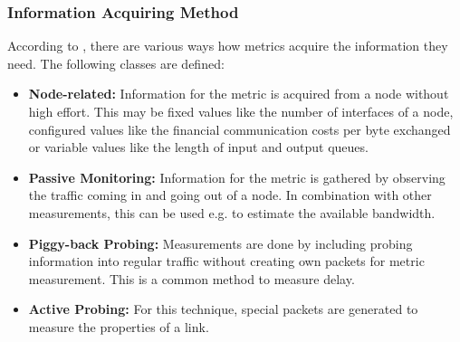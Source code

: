 \subsubsection{Information Acquiring Method} \label{subsec:txtInformationAcquiringMethod}
According to \cite{SurveyOnRoutingMetrics}, there are various ways how metrics acquire the information they need. The following classes are defined:
\begin{itemize}
    \item \textbf{Node-related:} Information for the metric is acquired from a node without high effort. This may be fixed values like the number of interfaces of a node, configured values like the financial communication costs per byte exchanged or variable values like the length of input and output queues.
    \item \textbf{Passive Monitoring:} Information for the metric is gathered by observing the traffic coming in and going out of a node. In combination with other measurements, this can be used e.g. to estimate the available bandwidth.
    \item \textbf{Piggy-back Probing:}  Measurements are done by including probing information into regular traffic without creating own packets for metric measurement. This is a common method to measure delay.
    \item \textbf{Active Probing:} For this technique, special packets are generated to measure the properties of a link.
\end{itemize}
%
